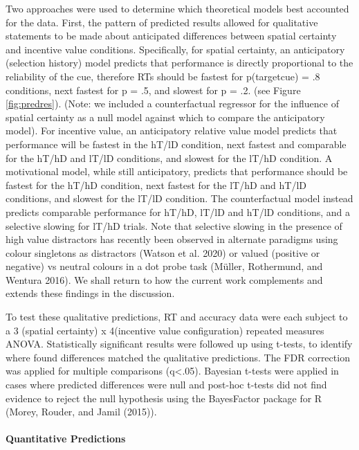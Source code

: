 \documentclass[11pt,halfline,a4paper,]{ouparticle}
\begin{document}
Two approaches were used to determine which theoretical models best accounted for the data. First, the pattern of predicted results allowed for qualitative statements to be made about anticipated differences between spatial certainty and incentive value conditions. Specifically, for spatial certainty, an anticipatory (selection history) model predicts that performance is directly proportional to the reliability of the cue, therefore RTs should be fastest for p(target\textbar cue) = .8 conditions, next fastest for p = .5, and slowest for p = .2. (see Figure \ref{fig:predres}). (Note: we included a counterfactual regressor for the influence of spatial certainty as a null model against which to compare the anticipatory model). For incentive value, an anticipatory relative value model predicts that performance will be fastest in the hT/lD condition, next fastest and comparable for the hT/hD and lT/lD conditions, and slowest for the lT/hD condition. A motivational model, while still anticipatory, predicts that performance should be fastest for the hT/hD condition, next fastest for the lT/hD and hT/lD conditions, and slowest for the lT/lD condition. The counterfactual model instead predicts comparable performance for hT/hD, lT/lD and hT/lD conditions, and a selective slowing for lT/hD trials. Note that selective slowing in the presence of high value distractors has recently been observed in alternate paradigms using colour singletons as distractors (Watson et al. 2020) or valued (positive or negative) vs neutral colours in a dot probe task (Müller, Rothermund, and Wentura 2016). We shall return to how the current work complements and extends these findings in the discussion.

To test these qualitative predictions, RT and accuracy data were each subject to a 3 (spatial certainty) x 4(incentive value configuration) repeated measures ANOVA. Statistically significant results were followed up using t-tests, to identify where found differences matched the qualitative predictions. The FDR correction was applied for multiple comparisons (q\textless.05). Bayesian t-tests were applied in cases where predicted differences were null and post-hoc t-tests did not find evidence to reject the null hypothesis using the BayesFactor package for R (Morey, Rouder, and Jamil (2015)).

\hypertarget{quantitative-predictions}{%
\paragraph{Quantitative Predictions}\label{quantitative-predictions}}
\end{document}

